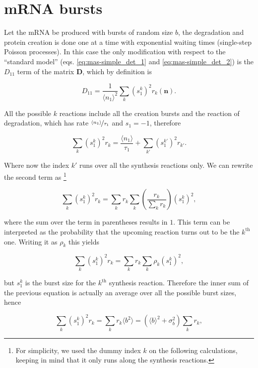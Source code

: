 \section{mRNA bursts}
Let the mRNA be produced with bursts of random size $b$, the degradation and protein creation is done one at a time with exponential waiting times (single-step Poisson processes). In this case the only modification with respect to the ``standard model'' (eqs. \eqref{eq:mas-simple_det_1} and \eqref{eq:mas-simple_det_2}) is the $D_{11}$ term of the matrix $\mathbf{D}$, which by definition is

\begin{equation}
  \label{eq:mrnab1}
  D_{11}=\frac{1}{\langle n_1\rangle^2}\sum_k(s_1^k)^2r_k(\mathbf{n}).
\end{equation}

All the possible $k$ reactions include all the creation bursts and the reaction of degradation, which has rate $\nicefrac{\langle n_1 \rangle}{\tau_1}$ and $s_1=-1$, therefore

\begin{equation}
  \label{eq:mrnab2}
  \sum_k(s_1^k)^2r_k = \frac{\langle n_1 \rangle}{\tau_1} + \sum_{k'}(s_1^{k'})^2r_{k'}.
\end{equation}

Where now the index $k'$ runs over all the synthesis reactions only. We can rewrite the second term as \footnote{For simplicity, we used the dummy index $k$ on the following calculations, keeping in mind that it only runs along the synthesis reactions.}

\begin{equation*}
  \sum_k(s_1^k)^2r_k=\sum_kr_k\sum_k\left(\frac{r_k}{\sum_kr_k}\right)(s_1^k)^2,
\end{equation*}

where the sum over the term in parentheses results in $1$. This term can be interpreted as the probability that the upcoming reaction turns out to be the $k^{\text{th}}$ one. Writing it as $\rho_k$ this yields

\begin{equation*}
  \sum_k(s_1^k)^2r_k=\sum_kr_k\sum_k\rho_k(s_1^k)^2,
\end{equation*}

but $s_1^k$ is the burst size for the $k^{\text{th}}$ synthesis reaction. Therefore the inner sum of the previous equation is actually an average over all the possible burst sizes, hence

\begin{equation}
  \label{eq:mrnab4}
  \sum_k(s_1^k)^2r_k=\sum_kr_k\langle b^2 \rangle=\left(\langle b\rangle^2+\sigma_b^2\right)\sum_kr_k,
\end{equation}

